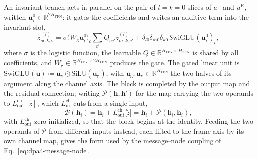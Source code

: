 An invariant branch acts in parallel on the pair of $l=k=0$ slices of $u^{\mathrm{L}}$ and $u^{\mathrm{R}}$, written $\mathbf{u}^{0}_i\in\mathbb{R}^{2H_{\mathrm{FFN}}}$: it gates the coefficients and writes an additive term into the invariant slot,
\begin{equation}
    \widetilde{z}^{\,(l)}_{m,k,c}
    = \sigma\!\bigl(W_{\mathrm{g}}\mathbf{u}^{0}_i\bigr)_{c}\sum_{c'}Q_{cc'}z^{(l)}_{m,k,c'}
    + \delta_{l0}\delta_{m0}\delta_{k0}\,\mathrm{SwiGLU}(\mathbf{u}^{0}_i)_{c},
    \label{eq:dpa4-wbb-scalar}
\end{equation}
where $\sigma$ is the logistic function, the learnable $Q\in\mathbb{R}^{H_{\mathrm{FFN}}\times H_{\mathrm{FFN}}}$ is shared by all coefficients, and $W_{\mathrm{g}}\in\mathbb{R}^{H_{\mathrm{FFN}}\times 2H_{\mathrm{FFN}}}$ produces the gate.
The gated linear unit is $\mathrm{SwiGLU}(\mathbf{u})\coloneqq\mathbf{u}_{\mathrm{v}}\odot\mathrm{SiLU}(\mathbf{u}_{\mathrm{g}})$, with $\mathbf{u}_{\mathrm{g}},\mathbf{u}_{\mathrm{v}}\in\mathbb{R}^{H_{\mathrm{FFN}}}$ the two halves of its argument along the channel axis.
The block is completed by the output map and the residual connection; writing $\mathcal{P}(\mathbf{h},\mathbf{h}')$ for the map carrying the two operands to $L^{\mathrm{ch}}_{\mathrm{out}}[\widetilde{z}]$, which $L^{\mathrm{ch}}_{\mathrm{in}}$ cuts from a single input,
\begin{equation}
    \mathcal{B}(\mathbf{h}_i)
    = \mathbf{h}_i + L^{\mathrm{ch}}_{\mathrm{out}}\bigl[\widetilde{z}\bigr]
    = \mathbf{h}_i + \mathcal{P}(\mathbf{h}_i,\mathbf{h}_i),
    \label{eq:dpa4-ffn}
\end{equation}
with $L^{\mathrm{ch}}_{\mathrm{out}}$ zero-initialized, so that the block begins at the identity.
Feeding the two operands of $\mathcal{P}$ from different inputs instead, each lifted to the frame axis by its own channel map, gives the form used by the message--node coupling of Eq.~\eqref{eq:dpa4-message-node}.

